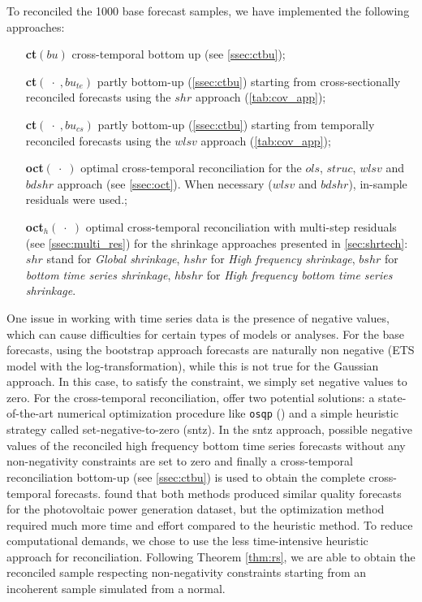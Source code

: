 \documentclass[a4paper,11pt]{article}
\theoremstyle{definition}
\begin{document}
To reconciled the 1000 base forecast samples, we have implemented the following approaches:
\begin{itemize}[nosep, leftmargin = 2.5cm]
	\item[\textbf{ct}$(bu)$] cross-temporal bottom up (see \autoref{ssec:ctbu});
	\item[\textbf{ct}$(\;\cdot\;, bu_{te})$] partly bottom-up (\autoref{ssec:ctbu}) starting from cross-sectionally reconciled forecasts using the $shr$ approach (\autoref{tab:cov_app});
	\item[\textbf{ct}$(\;\cdot\;, bu_{cs})$] partly bottom-up (\autoref{ssec:ctbu}) starting from temporally reconciled forecasts using the $wlsv$ approach (\autoref{tab:cov_app});
	\item[\textbf{oct}$(\;\cdot\;)$] optimal cross-temporal reconciliation for the $ols$, $struc$, $wlsv$ and $bdshr$ approach (see \autoref{ssec:oct}). When necessary ($wlsv$ and $bdshr$), in-sample residuals were used.;
	\item[\textbf{oct}$_{h}(\;\cdot\;)$] optimal cross-temporal reconciliation with multi-step residuals (see \autoref{ssec:multi_res}) for the shrinkage approaches presented in \autoref{sec:shrtech}: $shr$ stand for \textit{Global shrinkage}, $hshr$ for \textit{High frequency shrinkage}, $bshr$ for \textit{bottom time series shrinkage}, $hbshr$ for \textit{High frequency bottom time series shrinkage}.
\end{itemize}
One issue in working with time series data is the presence of negative values, which can cause difficulties for certain types of models or analyses.
For the base forecasts, using the bootstrap approach forecasts are naturally non negative (ETS model with the log-transformation), while this is not true for the Gaussian approach. In this case, to satisfy the constraint, we simply set negative values to zero. For the cross-temporal reconciliation, \citet{difonzo2023} offer two potential solutions: a state-of-the-art numerical optimization procedure like \texttt{osqp} (\citealp{stellato2019, stellato2020}) and a simple heuristic strategy called set-negative-to-zero (sntz). In the sntz approach, possible negative values of the reconciled high frequency bottom time series forecasts without any non-negativity constraints are set to zero and finally a cross-temporal reconciliation bottom-up (see \autoref{ssec:ctbu}) is used to obtain the complete cross-temporal forecasts. \cite{difonzo2023a} found that both methods produced similar quality forecasts for the photovoltaic power generation dataset, but the optimization method required much more time and effort compared to the heuristic method. To reduce computational demands, we chose to use the less time-intensive heuristic approach for reconciliation. Following Theorem \ref{thm:rs}, we are able to obtain the reconciled sample respecting non-negativity constraints starting from an incoherent sample simulated from a normal.
\end{document}
